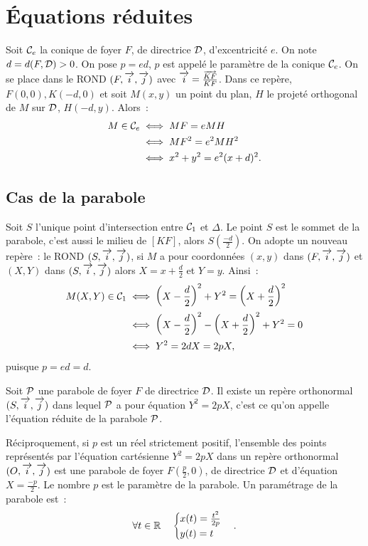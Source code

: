 \section{Équations réduites}
\label{sec:eqred}
Soit \(\con{e}\) la conique de foyer \(F\), de directrice \(\Dr\), 
d'excentricité \(e\). On note \(d = d(F, \Dr)>0\). On pose \(p = ed\), \(p\) est 
appelé le paramètre de la conique \(\con{e}\). On se place dans le ROND 
\((F, \vi, \vj)\) avec \(\vi = \frac{\vect{KF}}{KF}\). Dans ce repère, \(F(0, 0), 
K(-d, 0)\) et soit \(M(x, y)\) un point du plan, \(H\) le projeté orthogonal de 
\(M\) sur \(\Dr\), \(H(-d, y)\). Alors~:
\begin{align}
  M \in \con{e} &\iff MF = e MH \\
                &\iff MF^2 = e^2 MH^2\\
                &\iff x^2 + y^2 = e^2(x + d)^2.
\end{align}

\subsection{Cas de la parabole}
Soit \(S\) l'unique point d'intersection entre \(\con{1}\) et \(\Delta\). Le 
point \(S\) est le sommet de la parabole, c'est aussi le milieu de \([KF]\), 
alors \(S\left(\frac{-d}{2}\right)\). On adopte un nouveau repère~: le ROND 
\((S, \vi, \vj)\), si \(M\) a pour coordonnées \((x, y)\) dans \((F, \vi, \vj)\) et 
\((X, Y)\) dans \((S, \vi, \vj)\) alors \(X = x + \frac{d}{2}\) et \(Y = y\). Ainsi~:
\begin{align}
  M(X, Y) \in \con{1} &\iff 
  \left(X-\frac{d}{2}\right)^2 + Y^2 = \left(X + \frac{d}{2}\right)^2\\
                      &\iff \left(X-\frac{d}{2}\right)^2 - 
                      \left(X + \frac{d}{2}\right)^2 + Y^2 = 0\\
                      &\iff Y^2 = 2dX = 2pX,
\end{align}
puisque \(p = ed = d\).
\begin{theo}
  Soit \(\P\) une parabole de foyer \(F\) de directrice \(\Dr\). Il existe un 
  repère orthonormal \((S, \vi, \vj)\) dans lequel \(\P\) a pour équation 
  \(Y^2 = 2pX\), c'est ce qu'on appelle l'équation réduite de la parabole \(\P\).

  Réciproquement, si \(p\) est un réel strictement positif, l'ensemble des 
  points représentés par l'équation cartésienne \(Y^2 = 2pX\) dans un repère 
  orthonormal \(\rond\) est une parabole de foyer 
  \(F\left(\frac{p}{2},0\right)\), de directrice \(\Dr\) et d'équation 
  \(X = \frac{-p}{2}\). Le nombre \(p\) est le paramètre de la parabole. Un 
  paramétrage de la parabole est~:
  \begin{equation}
    \forall t \in \R \quad
    \begin{cases}
      x(t) = \frac{t^2}{2p} \\
      y(t) = t
    \end{cases}.
  \end{equation}
\end{theo}

